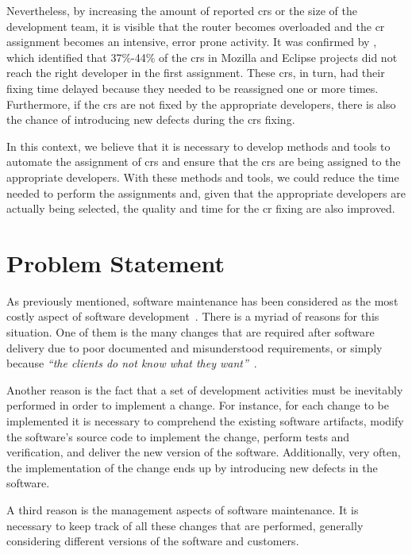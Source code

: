 {\lipsum[2-4]

Nevertheless, by increasing the amount of reported \acp{cr} or the size of the
development team, it is visible that the router becomes overloaded and the
\ac{cr} assignment becomes an intensive, error prone activity. It was confirmed
by , which identified that 37\%-44\% of the \acp{cr} in Mozilla
and Eclipse projects did not reach the right developer in the first assignment.
These \acp{cr}, in turn, had their fixing time delayed because they needed to be
reassigned one or more times. Furthermore, if the \acp{cr} are not fixed by the
appropriate developers, there is also the chance of introducing new defects
during the \acp{cr} fixing.

In this context, we believe that it is necessary to develop methods and tools to
automate the assignment of \acp{cr} and ensure that the \acp{cr} are being
assigned to the appropriate developers. With these methods and tools, we could
reduce the time needed to perform the assignments and, given that the
appropriate developers are actually being selected, the quality and time for the
\ac{cr} fixing are also improved.

\section{Problem Statement}
\label{sec:intro-problem-statement}

As previously mentioned, software maintenance has been considered as the most
costly aspect of software development~. There is a myriad of
reasons for this situation. One of them is the many changes that are required
after software delivery due to poor documented and misunderstood requirements,
or simply because \emph{``the clients do not know what they
want''}~.

Another reason is the fact that a set of development activities must be
inevitably performed in order to implement a change. For instance, for each
change to be implemented it is necessary to comprehend the existing software
artifacts, modify the software's source code to implement the change, perform
tests and verification, and deliver the new version of the software.
Additionally, very often, the implementation of the change ends up by
introducing new defects in the software.
   
A third reason is the management aspects of software maintenance. It is
necessary to keep track of all these changes that are performed, generally
considering different versions of the software and customers.

}
